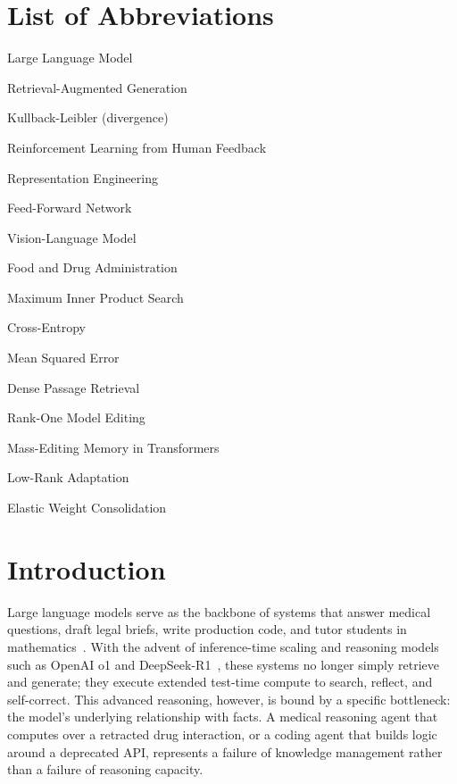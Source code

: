 \documentclass{article}
\begin{document}
\section*{List of Abbreviations}
\begin{description}[style=multiline, leftmargin=3cm, font=\bfseries]
  \item[LLM] Large Language Model
  \item[RAG] Retrieval-Augmented Generation
  \item[KL] Kullback-Leibler (divergence)
  \item[RLHF] Reinforcement Learning from Human Feedback
  \item[RepE] Representation Engineering
  \item[FFN] Feed-Forward Network
  \item[VLM] Vision-Language Model
  \item[FDA] Food and Drug Administration
  \item[MIPS] Maximum Inner Product Search
  \item[CE] Cross-Entropy
  \item[MSE] Mean Squared Error
  \item[DPR] Dense Passage Retrieval
  \item[ROME] Rank-One Model Editing
  \item[MEMIT] Mass-Editing Memory in Transformers
  \item[LoRA] Low-Rank Adaptation
  \item[EWC] Elastic Weight Consolidation
\end{description}

\section{Introduction}
\label{sec:introduction}

Large language models serve as the backbone of systems that answer medical questions, draft legal briefs, write production code, and tutor students in mathematics~\citep{brown2020language, achiam2023gpt4, team2023gemini}. With the advent of inference-time scaling and reasoning models such as OpenAI o1 and DeepSeek-R1~\citep{openai2024o1, guo2025deepseekr1}, these systems no longer simply retrieve and generate; they execute extended test-time compute to search, reflect, and self-correct. This advanced reasoning, however, is bound by a specific bottleneck: the model's underlying relationship with facts. A medical reasoning agent that computes over a retracted drug interaction, or a coding agent that builds logic around a deprecated API, represents a failure of knowledge management rather than a failure of reasoning capacity.
\end{document}
